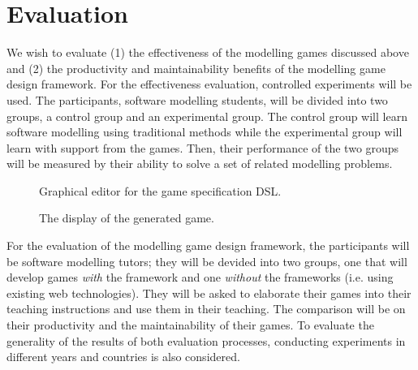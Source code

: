 \documentclass[runningheads,a4paper]{llncs}
\begin{document}
\section{Evaluation}
We wish to evaluate (1) the effectiveness of the modelling games discussed above and (2) the productivity and maintainability benefits of the modelling game design framework. For the effectiveness evaluation, controlled experiments will be used. The participants, software modelling students, will be divided into two groups, a control group and an experimental group. The control group will learn software modelling using traditional methods while the experimental group will learn with support from the games. Then, their performance of the two groups will be measured by their ability to solve a set of related modelling problems. 

\begin{figure}[H]
\centering
{}
\caption{Graphical editor for the game specification DSL.}
\label{fig:002}
\end{figure}

\begin{figure}[H]
\centering
{}
\caption{The display of the generated game.}
\label{fig:001}
\end{figure}

For the evaluation of the modelling game design framework, the participants will be software modelling tutors; they will be devided into two groups, one that will develop games \emph{with} the framework and one \emph{without} the frameworks (i.e. using existing web technologies). They will be asked to elaborate their games into their teaching instructions and use them in their teaching. The comparison will be on their productivity and the maintainability of their games. To evaluate the generality of the results of both evaluation processes, conducting experiments in different years and countries is also considered.
\end{document}
